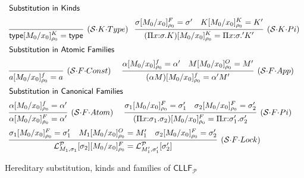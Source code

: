 \documentclass[submission,copyright,creativecommons]{eptcs}
\theoremstyle{plain}
\theoremstyle{definition}
\newcommand{\CLLFP} {\mbox{$\mathsf{CLLF}_{\mathcal P}$}}
\newcommand {\Lock}   [4] {{\mathcal{L}}^{#1}_{#2, #3}[{#4}]} \newcommand {\LockC} [3] {{\mathcal{L}}^{#1}_{#2}      [{#3}]}
\renewcommand {\P} {\mathcal{P}} \newcommand {\Q} {\mathcal{Q}}
\newcommand{\up}[1]   {\vspace{-#1mm}}
\begin{document}
\begin{figure}[t!]
{\small
 \begin{center}
   $
   \begin{array}[t]{l}
\mbox{\sf Substitution in Kinds}\hfill
     \\[2mm]

     \infer[(\Subst{\cdot}K{\cdot}Type)]
     {\Type[M_0/x_0]^K_{\rho_0}=\Type}
     {}

     \hspace{0.3cm}

     \infer[(\Subst{\cdot}K{\cdot}Pi)]
     {({\Prod x \sigma K})[M_0/x_0]^K_{\rho_0}={\Prod x \sigma' K'}}
     {\sigma[M_0/x_0]^F_{\rho_0}=\sigma' & K[M_0/x_0]^K_{\rho_0}=K'}
     \\[2mm]

\mbox{\sf Substitution in Atomic Families}\hfill
     \\[2mm]

     \infer[(\Subst{\cdot}F{\cdot}Const)]
     {a[M_0/x_0]^f_{\rho_0}=a}
     {}

     \hspace{0.5cm}

     \infer[(\Subst{\cdot}F{\cdot}App)]
     {(\alpha M)[M_0/x_0]^f_{\rho_0}=\alpha'M'}
     {\alpha[M_0/x_0]^f_{\rho_0}=\alpha' & M[M_0/x_0]^O_{\rho_0}=M'}
     \\[2mm]

\mbox{\sf Substitution in Canonical Families}\hfill
     \\[2mm]

     \infer[(\Subst{\cdot}F{\cdot}Atom)]
     {\alpha[M_0/x_0]^F_{\rho_0}=\alpha'}
     {\alpha[M_0/x_0]^f_{\rho_0}=\alpha'}

     \hspace{0.5cm}

     \infer[(\Subst{\cdot}F{\cdot}Pi)]
     {({\Prod x {\sigma_1} {\sigma_2}})[M_0/x_0]^F_{\rho_0}={\Prod x {\sigma'_1} {\sigma'_2}}}
     {\sigma_1[M_0/x_0]^F_{\rho_0}=\sigma'_1 & \sigma_2[M_0/x_0]^F_{\rho_0}=\sigma'_2}
     \\[2mm]

     \infer[(\Subst{\cdot}F{\cdot}Lock)]
     {{\Lock \P {M_1} {\sigma_1} {\sigma_2}}[M_0/x_0]^F_{\rho_0}={\Lock \P {M'_1} {\sigma'_1} {\sigma'_2}}}
     {\sigma_1[M_0/x_0]^F_{\rho_0}=\sigma'_1 &
       M_1[M_0/x_0]^O_{\rho_0}=M'_1 &
       \sigma_2[M_0/x_0]^F_{\rho_0}=\sigma'_2}
   \end{array}
   $
   \caption{Hereditary substitution, kinds and families of \CLLFP} \up{8}
   \label{fig:hsubstapp1}
 \end{center}}
\end{figure}
\end{document}
